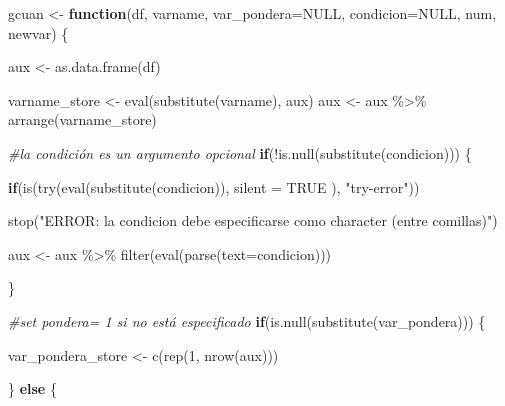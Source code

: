 \documentclass[
]{book}
\newenvironment{Shaded}{\begin{snugshade}}{\end{snugshade}}
\newcommand{\AttributeTok}[1]{\textcolor[rgb]{0.77,0.63,0.00}{#1}}
\newcommand{\CommentTok}[1]{\textcolor[rgb]{0.56,0.35,0.01}{\textit{#1}}}
\newcommand{\ConstantTok}[1]{\textcolor[rgb]{0.00,0.00,0.00}{#1}}
\newcommand{\ControlFlowTok}[1]{\textcolor[rgb]{0.13,0.29,0.53}{\textbf{#1}}}
\newcommand{\DecValTok}[1]{\textcolor[rgb]{0.00,0.00,0.81}{#1}}
\newcommand{\FunctionTok}[1]{\textcolor[rgb]{0.00,0.00,0.00}{#1}}
\newcommand{\NormalTok}[1]{#1}
\newcommand{\OtherTok}[1]{\textcolor[rgb]{0.56,0.35,0.01}{#1}}
\newcommand{\SpecialCharTok}[1]{\textcolor[rgb]{0.00,0.00,0.00}{#1}}
\newcommand{\StringTok}[1]{\textcolor[rgb]{0.31,0.60,0.02}{#1}}
\begin{document}
\begin{Shaded}
\begin{Highlighting}[numbers=left,,]
\NormalTok{gcuan }\OtherTok{\textless{}{-}} \ControlFlowTok{function}\NormalTok{(df, varname, }\AttributeTok{var\_pondera=}\ConstantTok{NULL}\NormalTok{, }\AttributeTok{condicion=}\ConstantTok{NULL}\NormalTok{, num, newvar) \{}
  
  
\NormalTok{  aux }\OtherTok{\textless{}{-}} \FunctionTok{as.data.frame}\NormalTok{(df) }
  
  
\NormalTok{  varname\_store }\OtherTok{\textless{}{-}} \FunctionTok{eval}\NormalTok{(}\FunctionTok{substitute}\NormalTok{(varname), aux) }
\NormalTok{  aux }\OtherTok{\textless{}{-}}\NormalTok{ aux }\SpecialCharTok{\%\textgreater{}\%} \FunctionTok{arrange}\NormalTok{(varname\_store)}
  
  
  \CommentTok{\#la condición es un argumento opcional}
  \ControlFlowTok{if}\NormalTok{(}\SpecialCharTok{!}\FunctionTok{is.null}\NormalTok{(}\FunctionTok{substitute}\NormalTok{(condicion))) \{}
      
     \ControlFlowTok{if}\NormalTok{(}\FunctionTok{is}\NormalTok{(}\FunctionTok{try}\NormalTok{(}\FunctionTok{eval}\NormalTok{(}\FunctionTok{substitute}\NormalTok{(condicion)), }\AttributeTok{silent =} \ConstantTok{TRUE}\NormalTok{ ), }\StringTok{"try{-}error"}\NormalTok{))}
        
        \FunctionTok{stop}\NormalTok{(}\StringTok{"ERROR: la condicion debe especificarse como character (entre comillas)"}\NormalTok{)}
      
\NormalTok{        aux }\OtherTok{\textless{}{-}}\NormalTok{ aux }\SpecialCharTok{\%\textgreater{}\%} \FunctionTok{filter}\NormalTok{(}\FunctionTok{eval}\NormalTok{(}\FunctionTok{parse}\NormalTok{(}\AttributeTok{text=}\NormalTok{condicion)))     }
                                                              
\NormalTok{   \}}
  
  
  
  \CommentTok{\#set pondera= 1 si no está especificado}
  \ControlFlowTok{if}\NormalTok{(}\FunctionTok{is.null}\NormalTok{(}\FunctionTok{substitute}\NormalTok{(var\_pondera))) \{                           }
    
\NormalTok{    var\_pondera\_store }\OtherTok{\textless{}{-}} \FunctionTok{c}\NormalTok{(}\FunctionTok{rep}\NormalTok{(}\DecValTok{1}\NormalTok{, }\FunctionTok{nrow}\NormalTok{(aux)))}
    
\NormalTok{    \} }\ControlFlowTok{else}\NormalTok{ \{}
    

\end{Highlighting}
\end{Shaded}
\end{document}
